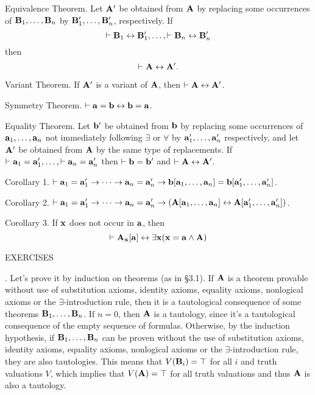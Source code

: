 
\proclaim Equivalence Theorem. Let ${\bf A}'$ be obtained from ${\bf A}$ by replacing some occurrences of ${\bf B}_1, \dots, {\bf B}_n$
by ${\bf B}_1', \dots, {\bf B}_n'$, respectively. If
$$
\vdash {\bf B}_1 \leftrightarrow {\bf B}_1', \dots, \vdash {\bf B}_n \leftrightarrow {\bf B}_n'
$$
then
$$
\vdash {\bf A} \leftrightarrow {\bf A}'.
$$

\proclaim Variant Theorem. If ${\bf A}'$ is a variant of ${\bf A}$, then $\vdash {\bf A} \leftrightarrow {\bf A}'$.

\proclaim Symmetry Theorem. $\vdash {\bf a} = {\bf b} \leftrightarrow {\bf b} = {\bf a}$.

\proclaim Equality Theorem. Let ${\bf b}'$ be obtained from ${\bf b}$ by replacing some occurrences of ${\bf a}_1, \dots, {\bf a}_n$
not immediately following $\exists$ or $\forall$ by ${\bf a}_1', \dots, {\bf a}_n'$ respectively, and let ${\bf A}'$ be
obtained from ${\bf A}$ by the same type of replacements. If $\vdash {\bf a}_1 = {\bf a}_1', \dots, \vdash {\bf a}_n = {\bf a}_n'$ then
$\vdash {\bf b} = {\bf b}'$ and $\vdash {\bf A} \leftrightarrow {\bf A}'$.

\proclaim Corollary 1. $\vdash {\bf a}_1 = {\bf a}_1' \to \cdots \to {\bf a}_n = {\bf a}_n' \to {\bf b}[{\bf a}_1, \dots, {\bf a}_n] = {\bf b}[{\bf a}_1', \dots, {\bf a}_n']$.

\proclaim Corollary 2. $\vdash {\bf a}_1 = {\bf a}_1' \to \cdots \to {\bf a}_n = {\bf a}_n' \to ({\bf A}[{\bf a}_1, \dots, {\bf a}_n] \leftrightarrow {\bf A}[{\bf a}_1', \dots, {\bf a}_n'])$.

\proclaim Corollary 3. If ${\bf x}$ does not occur in ${\bf a}$, then
$$
\vdash {\bf A}_{\bf x}[{\bf a}] \leftrightarrow \exists{\bf x} ({\bf x}={\bf a} \land {\bf A})
$$

\vfill
\break

\beginsection EXERCISES

. Let's prove it by induction on theorems (as in \S3.1).
If ${\bf A}$ is a theorem provable without use of substitution axioms, 
identity axioms, equality axioms, nonlogical axioms or the $\exists$-introduction 
rule, then it is a tautological consequence of some theorems ${\bf B}_1, \dots, {\bf B}_n$.
If $n=0$, then ${\bf A}$ is a tautology, since it's a tautological consequence of the
empty sequence of formulas. Otherwise, by the induction hypothesis, if 
${\bf B}_1, \dots, {\bf B}_n$ can be proven without the use of substitution axioms, identity 
axioms, equality axioms, nonlogical axioms or the $\exists$-introduction rule, 
they are also tautologies. This means that $V({\bf B}_i) = \top$ for all $i$ and truth
valuations $V$, which implies that $V({\bf A}) = \top$ for all truth valuations and thus
${\bf A}$ is also a tautology.
\medskip

